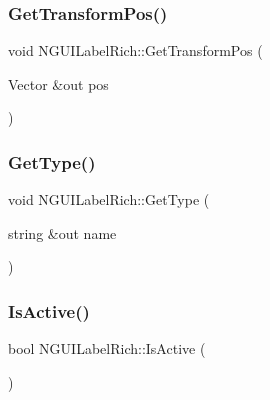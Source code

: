 \hypertarget{class_n_g_u_i_label_rich_a8653bd218c9f243f0a5320edf7d33ea6}{}\label{class_n_g_u_i_label_rich_a8653bd218c9f243f0a5320edf7d33ea6} 
\subsubsection{\texorpdfstring{Get\+Transform\+Pos()}{GetTransformPos()}}
{\footnotesize\ttfamily void N\+G\+U\+I\+Label\+Rich\+::\+Get\+Transform\+Pos (\begin{DoxyParamCaption}\item[{Vector \&out}]{pos }\end{DoxyParamCaption})}

\hypertarget{class_n_g_u_i_label_rich_a569d97dd7f7d51b31e94307814015a9f}{}\label{class_n_g_u_i_label_rich_a569d97dd7f7d51b31e94307814015a9f} 
\subsubsection{\texorpdfstring{Get\+Type()}{GetType()}}
{\footnotesize\ttfamily void N\+G\+U\+I\+Label\+Rich\+::\+Get\+Type (\begin{DoxyParamCaption}\item[{string \&out}]{name }\end{DoxyParamCaption})}

\hypertarget{class_n_g_u_i_label_rich_abb0cbcabe3143d310fc4465071e995a1}{}\label{class_n_g_u_i_label_rich_abb0cbcabe3143d310fc4465071e995a1} 
\subsubsection{\texorpdfstring{Is\+Active()}{IsActive()}}
{\footnotesize\ttfamily bool N\+G\+U\+I\+Label\+Rich\+::\+Is\+Active (\begin{DoxyParamCaption}{ }\end{DoxyParamCaption})}

\hypertarget{class_n_g_u_i_label_rich_a5d7e2a345f21e04bcd5d51f9ebcb4654}{}\label{class_n_g_u_i_label_rich_a5d7e2a345f21e04bcd5d51f9ebcb4654} 
